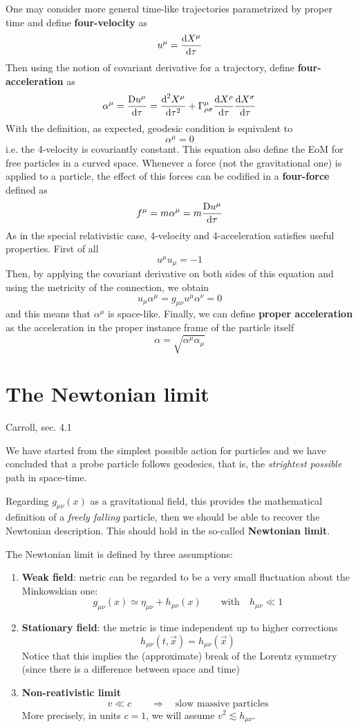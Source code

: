 \documentclass[../main/main.tex]{subfiles}
\begin{document}
One may consider more general time-like trajectories parametrized by proper time and define \textbf{four-velocity} as
\[u^\mu=\frac{\textup{d} X^\mu}{\textup{d} \tau}\]
Then using the notion of covariant derivative for a trajectory, define \textbf{four-acceleration} as
\[\alpha^\mu=\frac{\text{D}u^\mu}{\textup{d}\tau}=\frac{\textup{d}^2 X^\mu}{\textup{d}\tau^2}+{\Gamma}^{\mu}_{\rho \sigma}\frac{\textup{d} X^\rho}{\textup{d} \tau}\frac{\textup{d} X^\sigma}{\textup{d} \tau}\]
With the definition, as expected, geodesic condition is equivalent to 
\[\alpha^\mu=0\]
i.e. the 4-velocity is covariantly constant. This equation also define the EoM for free particles in a curved space. Whenever a force (not the gravitational one) is applied to a particle, the effect of this forces can be codified in a \textbf{four-force} defined as
\[f^\mu=m\alpha^\mu=m\frac{\text{D}u^\mu}{\textup{d}\tau}\]
As in the special relativistic case, 4-velocity and 4-acceleration satisfies useful properties. First of all
\[u^\mu u_\mu=-1\]
Then, by applying the covariant derivative on both sides of this equation and using the  metricity of the connection, we obtain
\[u_\mu\alpha^\mu=g_{\mu\nu}u^\mu\alpha^\nu=0\]
and this means that $\alpha^\mu$ is space-like. 
Finally, we can define \textbf{proper acceleration} as the acceleration in the proper instance frame of the particle itself
\[\alpha=\sqrt{\alpha^\mu\alpha_\mu}\]


\section{The Newtonian limit}

\textsf{Carroll, sec. 4.1}

We have started from the simplest possible action for particles and we have concluded that a probe particle follows geodesics, that is, the \emph{strightest possible} path in space-time. 

Regarding $g_{\mu\nu}(x)$ as a gravitational field, this provides the mathematical definition of a \emph{freely falling} particle, then we should be able to recover the Newtonian description. This should hold in the so-called \textbf{Newtonian limit}.

The Newtonian limit is defined by three assumptions:
\begin{enumerate}[label=(\arabic*)]
\item \textbf{Weak field}: metric can be regarded to be a very small fluctuation about the Minkowskian one:
\[g_{\mu\nu}(x)\simeq\eta_{\mu\nu}+h_{\mu\nu}(x)\qquad\text{with}\quad h_{\mu\nu}\ll1\]
\item \textbf{Stationary field}: the metric is time independent up to higher corrections
\[h_{\mu\nu}(t,\vec x)=h_{\mu\nu}(\vec x)\]
Notice that this implies the (approximate) break of the  Lorentz symmetry (since there is a difference between space and time)
\item \textbf{Non-reativistic limit}
\[v\ll c\qquad\Rightarrow\quad\text{slow massive particles}\]
More precisely, in units $c=1$, we will assume $v^2\lesssim h_{\mu\nu}$. 
\end{enumerate}
\end{document}
